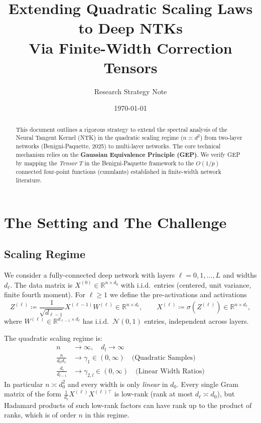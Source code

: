 \documentclass[11pt]{article}
\title{\textbf{Extending Quadratic Scaling Laws to Deep NTKs}\\ \large{Via Finite-Width Correction Tensors}}
\author{Research Strategy Note}
\date{\today}
\newcommand{\RR}{\mathbb{R}}
\begin{document}
\maketitle

\begin{abstract}
    This document outlines a rigorous strategy to extend the spectral analysis of the Neural Tangent Kernel (NTK) in the quadratic scaling regime ($n \asymp d^2$) from two-layer networks (Benigni-Paquette, 2025) to multi-layer networks. The core technical mechanism relies on the \textbf{Gaussian Equivalence Principle (GEP)}. We verify GEP by mapping the \textit{Tensor $T$} in the Benigni-Paquette framework to the $O(1/p)$ connected four-point functions (cumulants) established in finite-width network literature.
\end{abstract}

\section{The Setting and The Challenge}

\subsection{Scaling Regime}
We consider a fully-connected deep network with layers $\ell=0,1,\dots,L$ and widths $d_\ell$.
The data matrix is $X^{(0)}\in\RR^{n\times d_0}$ with i.i.d.\ entries (centered, unit variance, finite fourth moment).
For $\ell\geq 1$ we define the pre-activations and activations
\begin{equation}
  Z^{(\ell)} \coloneqq \frac{1}{\sqrt{d_{\ell-1}}}X^{(\ell-1)}W^{(\ell)}\in\RR^{n\times d_\ell},
  \qquad
  X^{(\ell)} \coloneqq \sigma(Z^{(\ell)})\in\RR^{n\times d_\ell},
\end{equation}
where $W^{(\ell)}\in\RR^{d_{\ell-1}\times d_\ell}$ has i.i.d.\ $\mathcal{N}(0,1)$ entries, independent across layers.

The quadratic scaling regime is:
\begin{align*}
    n &\to \infty, \quad d_l \to \infty \\
    \frac{n}{d_0 d_1} &\to \gamma_1 \in (0, \infty) \quad \text{(Quadratic Samples)} \\
    \frac{d_l}{d_{l-1}} &\to \gamma_{2,l} \in (0, \infty) \quad \text{(Linear Width Ratios)}
\end{align*}
In particular $n\asymp d_0^2$ and every width is only \emph{linear} in $d_0$.
Every single Gram matrix of the form $\frac{1}{d_\ell}X^{(\ell)}X^{(\ell)\top}$ is low-rank (rank at most $d_\ell\asymp d_0$), but Hadamard products of such low-rank factors can have rank up to the product of ranks, which is of order $n$ in this regime.
\end{document}

